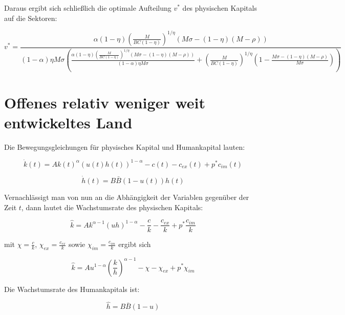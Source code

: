 Daraus ergibt sich schlie{\ss}lich die optimale Aufteilung $v^*$ des physischen Kapitals auf die Sektoren:


	\begin{equation}
		\boxed{
		v^*=\frac{\alpha  (1-\eta ) \left(\frac{M}{B C (1-\eta )}\right)^{1/\eta } (M \sigma -(1-\eta ) (M-\rho ))}{(1-\alpha ) \eta  M \sigma  \left(\frac{\alpha  (1-\eta ) \left(\frac{M}{B C (1-\eta )}\right)^{1/\eta } (M \sigma -(1-\eta ) (M-\rho ))}{(1-\alpha ) \eta  M \sigma }+\left(\frac{M}{B C (1-\eta )}\right)^{1/\eta } \left(1-\frac{M \sigma -(1-\eta ) (M-\rho )}{M \sigma }\right)\right)}}
	\end{equation}


\section[Offenes relativ weniger weit entwickeltes Land]{Offenes relativ weniger weit entwickeltes Land }\label{APPENDIXEL}


Die Bewegungsgleichungen für physisches Kapital und Humankapital lauten:


	\begin{equation}
		\dot{k}(t)=Ak(t)^\alpha(u(t)h(t))^{1-\alpha}-c(t)-c_{ex}(t)+p^*c_{im}(t)
	\end{equation}


	\begin{equation}
		\dot{h}(t)=B\bar{B}(1-u(t))h(t)
	\end{equation}


Vernachlässigt man von nun an die Abhängigkeit der Variablen gegenüber der Zeit $t$, dann lautet die Wachstumsrate des physischen Kapitals:


	\begin{equation*}
		\hat{k}=A k^{\alpha-1}(uh)^{1-\alpha}-\frac{c}{k}-\frac{c_{ex}}{k}+p^*\frac{c_{im}}{k}
	\end{equation*}


mit $\chi=\frac{c}{k}$, $\chi_{ex}=\frac{c_{ex}}{k}$ sowie $\chi_{im}=\frac{c_{im}}{k}$ ergibt sich


	\begin{equation}
		\boxed{\hat{k}=A u^{1-\alpha}\left(\frac{k}{h}\right)^{\alpha-1}-\chi-\chi_{ex}+p^*\chi_{im}}
	\end{equation}


Die Wachstumsrate des Humankapitals ist: 


	\begin{equation}
		\hat{h}=B\bar{B}(1-u)
	\end{equation}


